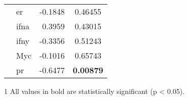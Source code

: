 \begin{table}[htpb]
\begin{threeparttable}
\begin{tabular}{llrc}
                                                                           & \gls{er}   & -0.1848   & 0.46455 \\
                                                                           & \gls{ifna} & 0.3959    & 0.43015 \\
                                                                           & \gls{ifny} & -0.3356   & 0.51243 \\
                                                                           & Myc        & -0.1016   & 0.65743 \\
                                                                           & \gls{pr}   & -0.6477   & \bfseries 0.00879  \\
				\hline
				\hline
			\end{tabular}
			\begin{tablenotes}
				\begin{footnotesize}
				\item [1] All values in bold are statistically significant (p \textless{} 0.05).
				\end{footnotesize}
			\end{tablenotes}
		\end{threeparttable}
	\end{table}

